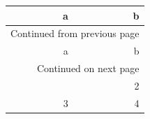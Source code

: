 \documentclass[11pt]{article}
\author{root}
\date{\today}
\title{}
\begin{document}
\tableofcontents

\begin{longtable}{rr}
\toprule
a & b\\[0pt]
\midrule
\endfirsthead
\multicolumn{2}{l}{Continued from previous page} \\[0pt]
\toprule

a & b \\[0pt]

\midrule
\endhead
\midrule\multicolumn{2}{r}{Continued on next page} \\
\endfoot
\endlastfoot
1 & 2\\[0pt]
3 & 4\\[0pt]
\bottomrule
\end{longtable}
\end{document}

